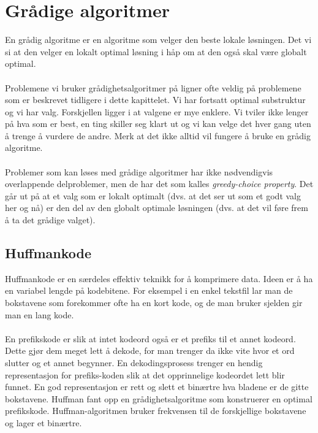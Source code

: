 \section{Grådige algoritmer}
En grådig algoritme er en algoritme som velger den beste lokale løsningen. Det vi si at den velger en lokalt optimal løsning i håp om at den også skal være globalt optimal.
\\\\
Problemene vi bruker grådighetsalgoritmer på ligner ofte veldig på problemene som er beskrevet tidligere i dette kapittelet. Vi har fortsatt optimal substruktur og vi har valg. Forskjellen ligger i at valgene er mye enklere. Vi tviler ikke lenger på hva som er best, en ting skiller seg klart ut og vi kan velge det hver gang uten å trenge å vurdere de andre. Merk at det ikke alltid vil fungere å bruke en grådig algoritme.
\\\\
Problemer som kan løses med grådige algoritmer har ikke nødvendigvis overlappende delproblemer, men de har det som kalles \textit{greedy-choice property}. Det går ut på at et valg som er lokalt optimalt (dvs. at det ser ut som et godt valg her og nå) er den del av den globalt optimale løsningen (dvs. at det vil føre frem å ta det grådige valget).

\subsection{Huffmankode}
Huffmankode er en særdeles effektiv teknikk for å komprimere data. Ideen er å ha en variabel lengde på kodebitene. For eksempel i en enkel tekstfil lar man de bokstavene som forekommer ofte ha en kort kode, og de man bruker sjelden gir man en lang kode.
\\\\
En prefikskode er slik at intet kodeord også er et prefiks til et annet kodeord. Dette gjør dem meget lett å dekode, for man trenger da ikke vite hvor et ord slutter og et annet begynner. En dekodingsprosess trenger en hendig representasjon for prefiks-koden slik at det opprinnelige kodeordet lett blir funnet. En god representasjon er rett og slett et binærtre hva bladene er de gitte bokstavene. Huffman fant opp en grådighetsalgoritme som konstruerer en optimal prefikskode. Huffman-algoritmen bruker frekvensen til de forskjellige bokstavene og lager et binærtre.

